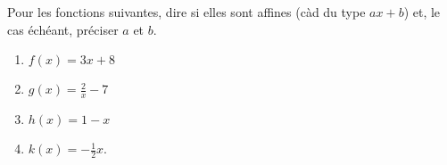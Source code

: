 
\begin{exercice}\label{exosmath-0409}

    Pour les fonctions suivantes, dire si elles sont affines (càd du type \( ax+b\)) et, le cas échéant, préciser \( a\) et \( b\).
    \begin{multicols}{3}
        \begin{enumerate}
            \item
                \( f(x)=3x+8\)
            \item
                \( g(x)=\frac{ 2 }{ x }-7\)
            \item
                \( h(x)=1-x\)
            \item
                \( k(x)=-\frac{ 1 }{2}x\).
        \end{enumerate}
    \end{multicols}

\end{exercice}
